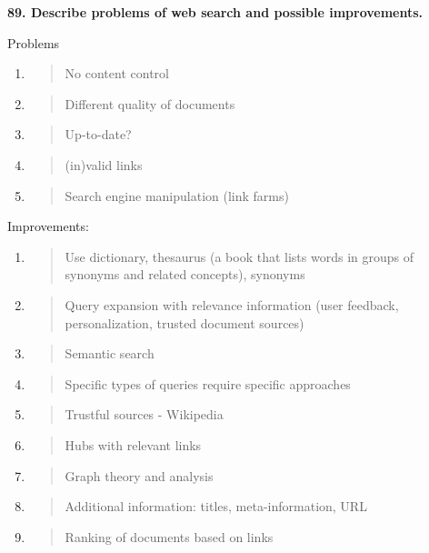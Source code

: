\textbf{89. Describe problems of web search and possible improvements.}

Problems

\begin{enumerate}
\def\labelenumi{\arabic{enumi}.}
\item
  \begin{quote}
  No content control
  \end{quote}
\item
  \begin{quote}
  Different quality of documents
  \end{quote}
\item
  \begin{quote}
  Up-to-date?
  \end{quote}
\item
  \begin{quote}
  (in)valid links
  \end{quote}
\item
  \begin{quote}
  Search engine manipulation (link farms)
  \end{quote}
\end{enumerate}

Improvements:

\begin{enumerate}
\def\labelenumi{\arabic{enumi}.}
\item
  \begin{quote}
  Use dictionary, thesaurus (a book that lists words in groups of
  synonyms and related concepts), synonyms
  \end{quote}
\item
  \begin{quote}
  Query expansion with relevance information (user feedback,
  personalization, trusted document sources)
  \end{quote}
\item
  \begin{quote}
  Semantic search
  \end{quote}
\item
  \begin{quote}
  Specific types of queries require specific approaches
  \end{quote}
\item
  \begin{quote}
  Trustful sources - Wikipedia
  \end{quote}
\item
  \begin{quote}
  Hubs with relevant links
  \end{quote}
\item
  \begin{quote}
  Graph theory and analysis
  \end{quote}
\item
  \begin{quote}
  Additional information: titles, meta-information, URL
  \end{quote}
\item
  \begin{quote}
  Ranking of documents based on links
  \end{quote}
\end{enumerate}


